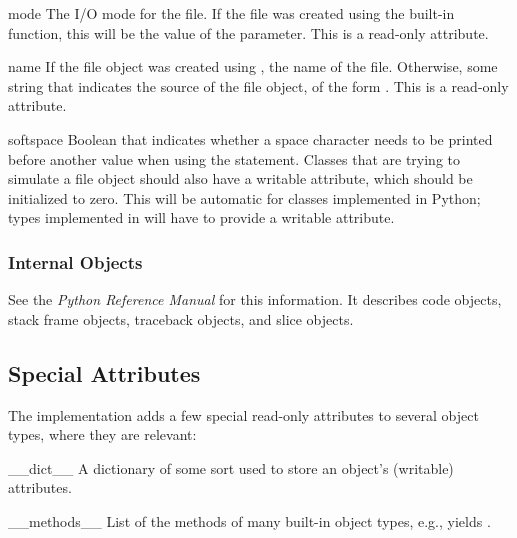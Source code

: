 \begin{memberdesc}[file]{mode}
The I/O mode for the file.  If the file was created using the
 built-in function, this will be the value of the
 parameter.  This is a read-only attribute.
\end{memberdesc}

\begin{memberdesc}[file]{name}
If the file object was created using , the name of
the file.  Otherwise, some string that indicates the source of the
file object, of the form \samp{<\mbox{\ldots}>}.  This is a read-only
attribute.
\end{memberdesc}

\begin{memberdesc}[file]{softspace}
Boolean that indicates whether a space character needs to be printed
before another value when using the  statement.
Classes that are trying to simulate a file object should also have a
writable  attribute, which should be initialized to
zero.  This will be automatic for classes implemented in Python; types
implemented in \C{} will have to provide a writable 
attribute.
\end{memberdesc}

\subsubsection{Internal Objects \label{typesinternal}}

See the \emph{Python Reference Manual} for this information.  It
describes code objects, stack frame objects, traceback objects, and
slice objects.


\subsection{Special Attributes \label{specialattrs}}

The implementation adds a few special read-only attributes to several
object types, where they are relevant:

\begin{memberdescni}{__dict__}
A dictionary of some sort used to store an
object's (writable) attributes.
\end{memberdescni}

\begin{memberdescni}{__methods__}
List of the methods of many built-in object types,
e.g.,  yields
.
\end{memberdescni}


